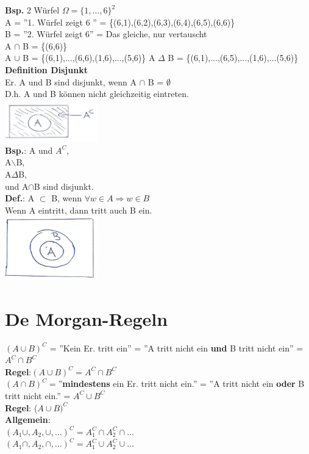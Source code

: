 \textbf{Bsp.} 2 Würfel $\Omega = \{1,...,6\}^2$\\
A = ''1. Würfel zeigt 6 '' = \{(6,1),(6,2),(6,3),(6,4),(6,5),(6,6)\}\\
B = ''2. Würfel zeigt 6'' = Das gleiche, nur vertauscht\medskip\\
A $\cap$ B = \{(6,6)\}\\
A $\cup$ B = \{(6,1),...,(6,6),(1,6),...,(5,6)\}
A $\Delta$ B = \{(6,1),...,(6,5),...,(1,6),...(5,6)\}\newpage
\textbf{Definition Disjunkt}\\
Er. A und B sind disjunkt, wenn A $\cap$ B = $\emptyset$\\D.h. A und B können nicht gleichzeitig eintreten.\\\includegraphics[width=0.3\textwidth]{img/komplement.PNG}\medskip\\
\textbf{Bsp.}: A und $A^C$,\\ A$\backslash$B,\\ A$\Delta$B,\\ und A$\cap$B sind disjunkt.\medskip\\
\textbf{Def.}: A $\subset$ B, wenn $\forall w \in A \Rightarrow w \in B$\\Wenn A eintritt, dann tritt auch B ein.\\\includegraphics[width=0.3\textwidth]{img/subset.PNG}\medskip\\
\section{De Morgan-Regeln}
$\left( A \cup B\right)^C$ = ''Kein Er. tritt ein'' = ''A tritt nicht ein \textbf{und} B tritt nicht ein'' = $A^C \cap B^C$\\
\textbf{Regel}:$(A\cup B)^C = A^C \cap B^C$\medskip\\
$(A \cap B)^C =$''\textbf{mindestens} ein Er. tritt nicht ein.'' = ''A tritt nicht ein \textbf{oder} B tritt nicht ein.'' = $A^C\cup B^C$\medskip\\
\textbf{Regel}: ($A\cup B)^C$\\
\textbf{Allgemein}: \\$(A_1\cup,A_2,\cup,...)^C = A_1^C\cap A_2^C\cap...$\\
$(A_1\cap,A_2,\cap,...)^C = A_1^C\cup A_2^C\cup...$
